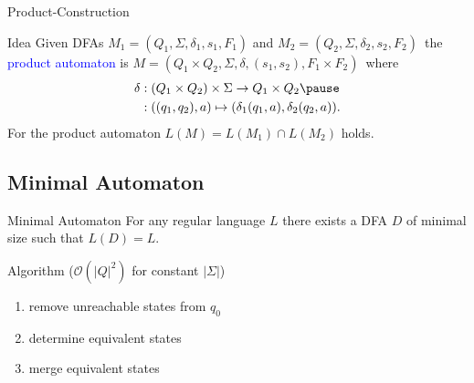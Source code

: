 \documentclass{beamer}
\def\padding{\vspace{0.5cm}}
\def\b{\textcolor{blue}}
\begin{document}
\begin{frame}{Product-Construction}
    \begin{block}{Idea}
        Given DFAs $M_1 = (Q_1, \Sigma, \delta_1, s_1, F_1)$ and $M_2 = (Q_2, \Sigma, \delta_2, s_2, F_2)$\pause\ the \b{product automaton} is $M = (Q_1 \times Q_2, \Sigma, \delta, (s_1, s_2), F_1 \times F_2)$\pause\ where
        \begin{align*}
            \delta &: (Q_1 \times Q_2) \times \Sigma \to Q_1 \times Q_2 \pause\\
                   &: ((q_1, q_2), a) \mapsto (\delta_1(q_1, a), \delta_2(q_2, a)).
        \end{align*}\pause\padding
        For the product automaton $L(M) = L(M_1) \cap L(M_2)$ holds.
    \end{block}
\end{frame}

\subsection{Minimal Automaton}

\begin{frame}{Minimal Automaton}
    For any regular language $L$ there exists a DFA $D$ of minimal size such that $L(D) = L$.\pause
    \begin{block}{Algorithm ($\mathcal{O}(|Q|^2)$ for constant $|\Sigma|$)}
        \begin{enumerate}
            \item remove unreachable states from $q_0$\pause
            \item determine equivalent states\pause
            \item merge equivalent states
        \end{enumerate}
    \end{block}
\end{frame}
\end{document}
